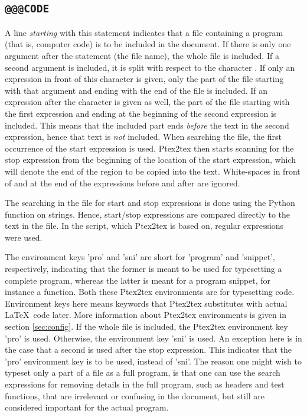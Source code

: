 \documentclass[a4paper,11pt]{article}
\begin{document}
\subsection{\texttt{@@@CODE}}
A line \emph{starting} with this statement indicates that a file containing a program
(that is, computer code) is to be included in the document. If there is only
one argument after the statement (the file name), the whole file is included. If a second
argument is included, it is split with respect to the character
. If only an expression in front of this character is given,
only the part of the file starting with that
argument and ending with the end of the file is included. If an expression
after the character is given as well, the part of the file starting with the
first expression and ending at the beginning of the second expression is
included. This means that the included part ends \emph{before} the text in the second
expression, hence that text is \emph{not} included. When searching the file, the
first occurrence of the start expression is used. Ptex2tex then starts scanning
for the stop expression from the beginning of the location of the start expression,
which will denote the end of the
region to be copied into the text. White-spaces in front of and at the end of the
expressions before and after  are ignored.

The searching in the file for start and stop expressions is done using the
Python function  on strings. Hence, start/stop expressions are
compared directly to the text in the file.
In the  script,
which Ptex2tex is based on, regular expressions were used.

The environment keys 'pro'
and 'sni' are short for 'program' and 'snippet', respectively, indicating that
the former is meant to be used for typesetting a complete program, whereas the
latter is meant for a program snippet, for instance a function. Both these
Ptex2tex environments are for typesetting code. Environment keys
here means keywords that Ptex2tex substitutes with actual \LaTeX~code
later. More information about Ptex2tex environments is given in section \ref{sec:config}.
If the whole file is included, the Ptex2tex environment key 'pro' is used. Otherwise,
the environment key 'sni' is used. An exception here is in the case that a
second  is used after the stop expression. This indicates that the 'pro'
environment key is to be used, instead of 'sni'. The reason one might wish to
typeset only a part of a file as a full program, is that one can use the
search expressions for removing details in the full program, such as headers
and test functions, that are irrelevant or confusing in the document, but
still are considered important for the actual program.
\end{document}
